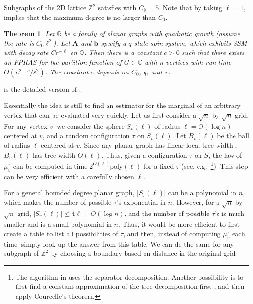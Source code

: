 \documentclass[11pt,a4paper]{amsart}
\def\=#1{\mathbb{#1}}
\newcommand{\abs}[1]{\ensuremath{\left\vert#1\right\vert}}
\newcommand{\eps}{\varepsilon}
\newtheorem{theorem}{Theorem}
\theoremstyle{definition}
\theoremstyle{remark}
\begin{document}
Subgraphs of the 2D lattice $\=Z^2$ satisfies  with $C_0=5$.
Note that by taking $\ell=1$,  implies that the maximum degree is no larger than $C_0$.

\begin{theorem}\label{lattice-counting}
  Let $\=G$ be a family of planar graphs with quadratic growth (assume the rate is $C_0\ell^2$).
  Let ${\bm A}$ and ${\bm b}$ specify a $q$-state spin system, which exhibits SSM with decay rate $Cr^{-\ell}$ on $\=G$.
  Then there is a constant $c>0$ such that there exists an FPRAS for the partition function of $G\in\=G$ with $n$ vertices with run-time $\widetilde{O}(n^{2-c}/\eps^2)$.
  The constant $c$ depends on $C_0$, $q$, and~$r$.
\end{theorem}

 is the detailed version of .

Essentially the idea is still to find an estimator for the marginal of an arbitrary vertex that can be evaluated very quickly.
Let us first consider a $\sqrt{n}$-by-$\sqrt{n}$ grid.
For any vertex $v$, we consider the sphere $S_v(\ell)$ of radius $\ell=O(\log n)$ centered at $v$,
and a random configuration $\tau$ on $S_v(\ell)$.
Let $B_v(\ell)$ be the ball of radius $\ell$ centered at $v$.
Since any planar graph has linear local tree-width \cite{DH04,Epp00},
$B_v(\ell)$ has tree-width $O(\ell)$.
Thus, given a configuration $\tau$ on $S$, 
the law of $\mu_v^{\tau}$ can be computed in time $2^{O(\ell)}\textrm{poly}(\ell)$ for a fixed $\tau$ (see, e.g.~\cite{YZ13}\footnote{The algorithm in \cite{YZ13} uses the separator decomposition. Another possibility is to first find a constant approximation of the tree decomposition first \cite{KT16}, and then apply Courcelle's theorem.}).
This step can be very efficient with a carefully chosen $\ell$.

For a general bounded degree planar graph, $\abs{S_v(\ell)}$ can be a polynomial in $n$, which makes the number of possible $\tau$'s exponential in $n$.
However, for a $\sqrt{n}$-by-$\sqrt{n}$ grid, $\abs{S_v(\ell)}\le 4\ell=O(\log n)$,
and the number of possible $\tau$'s is much smaller and is a small polynomial in $n$.
Thus, it would be more efficient to first create a table to list all possibilities of $\tau$,
and then, instead of computing $\mu_v^{\tau}$ each time,
 simply look up the answer from this table. We can do the same for any subgraph of $\mathbb{Z}^2$ by choosing a boundary based on distance in the original grid. 
\end{document}
